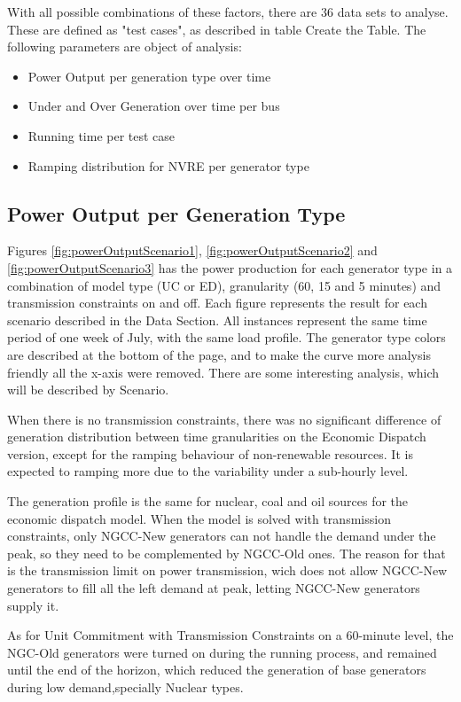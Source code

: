 \documentclass[12pt,LUDisStyle,twosided]{book}
\begin{document}
With all possible combinations of these factors, there are 36 data sets to analyse. These are defined as "test cases", as described in table Create the Table. The following parameters are object of analysis:

\begin{itemize}
\item Power Output per generation type over time
\item Under and Over Generation over time per bus
\item Running time per test case
\item Ramping distribution for NVRE per generator type
\end{itemize}

\subsection{Power Output per Generation Type}

Figures \ref{fig:powerOutputScenario1}, \ref{fig:powerOutputScenario2} and \ref{fig:powerOutputScenario3} has the power production for each generator type in a combination of model type (UC or ED), granularity (60, 15 and 5 minutes) and transmission constraints on and off. Each figure represents the result for each scenario described in the Data Section. All instances represent the same time period of one week of July, with the same load profile. The generator type colors are described at the bottom of the page, and to make the curve more analysis friendly all the x-axis were removed. There are some interesting analysis, which will be described by Scenario.


When there is no transmission constraints, there was no significant difference of generation distribution between time granularities on the Economic Dispatch version, except for the ramping behaviour of non-renewable resources. It is expected to ramping more due to the variability under a sub-hourly level. 

The generation profile is the same for nuclear, coal and oil sources for the economic dispatch model. When the model is solved with transmission constraints, only NGCC-New generators can not handle the demand under the peak, so they need to be complemented by NGCC-Old ones. The reason for that is the transmission limit on power transmission, wich does not allow NGCC-New generators to fill all the left demand at peak, letting NGCC-New generators supply it.

As for Unit Commitment with Transmission Constraints on a 60-minute level, the NGC-Old generators were turned on during the running process, and remained until the end of the horizon, which reduced the generation of base generators during low demand,specially Nuclear types.
\end{document}
